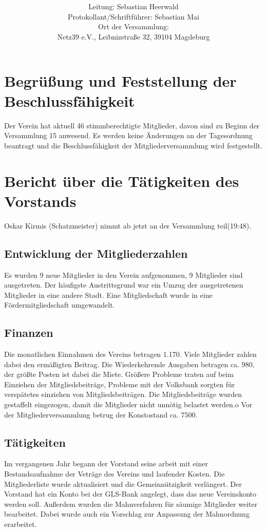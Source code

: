 \documentclass[a4paper,12pt,titlepage]{scrartcl}
\title{ \logo \\ \vspace{0.2\baselineskip} \thetitle}
\author{
Leitung: Sebastian Heerwald\\
Protokollant/Schriftführer: Sebastian Mai \\
Ort der Versammlung:\\ Netz39 e.V., Leibnizstraße 32, 39104 Magdeburg \\
}
\date{\displaydate{date}} %
\begin{document}
\maketitle
\tableofcontents

\clearpage

\section{Begrüßung und Feststellung der Beschlussfähigkeit}

Der Verein hat aktuell 46 stimmberechtigte Mitglieder, davon sind zu Beginn der Versammlung 15 anwesend. Es werden keine Änderungen an der Tagesordnung beantragt und die Beschlussfähigkeit der Mitgliederversammlung wird festgestellt.

\section{Bericht über die Tätigkeiten des Vorstands}
Oskar Kirmis (Schatzmeister) nimmt ab jetzt an der Versammlung teil(19:48).

\subsection{Entwicklung der Mitgliederzahlen}
Es wurden 9 neue Mitglieder in den Verein aufgenommen, 9 Mitglieder sind ausgetreten. Der häufigste Austrittsgrund war ein Umzug der ausgetretenen Mitglieder in eine andere Stadt. Eine Mitgliedschaft wurde in eine Fördermitgliedschaft umgewandelt.

\subsection{Finanzen}
Die monatlichen Einnahmen des Vereins betragen 1.170\EUR. Viele Mitglieder zahlen dabei den ermäßigten Beitrag. Die Wiederkehrende Ausgaben betragen ca. 980\EUR, der größte Posten ist dabei die Miete.
Größere Probleme traten auf beim Einziehen der Mitgliedsbeiträge, Probleme mit der Volksbank sorgten für verspätetes einziehen von Mitgliedsbeiträgen. Die Mitgliedsbeiträge wurden gestaffelt eingezogen, damit die Mitglieder nicht unnötig belastet werden.o
Vor der Mitgliederversammlung betrug der Konstostand ca. 7500\EUR.

\subsection{Tätigkeiten}
Im vergangenen Jahr begann der Vorstand seine arbeit mit einer Bestandsaufnahme der Veträge des Vereins und laufender Kosten. Die Mitgliederliste wurde aktualisiert und die Gemeinnützigkeit verlängert. Der Vorstand hat ein Konto bei der GLS-Bank angelegt, dass das neue Vereinskonto werden soll. Außerdem wurden die Mahnverfahren für säumige Mitglieder weiter bearbeitet. Dabei wurde auch ein Vorschlag zur Anpassung der Mahnordnung erarbeitet.
\end{document}
